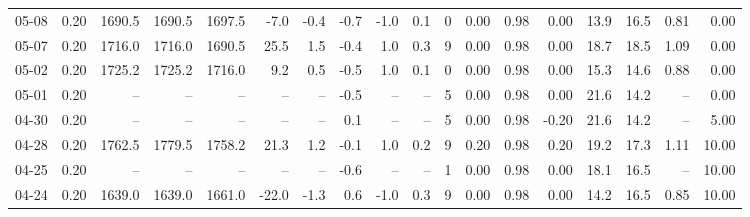 \begin{threeparttable}
{\begin{tabular}{lrrrrrrrrrrrrrrrrr}
  05-08 &     0.20 & 1690.5 & 1690.5 & 1697.5 &       -7.0 &           -0.4 &                      -0.7 &                     -1.0 &                 0.1 &              0 &       0.00 &      0.98 &           0.00 &             13.9 &                16.5 &            0.81 &                   0.00 \\
  05-07 &     0.20 & 1716.0 & 1716.0 & 1690.5 &       25.5 &            1.5 &                      -0.4 &                      1.0 &                 0.3 &              9 &       0.00 &      0.98 &           0.00 &             18.7 &                18.5 &            1.09 &                   0.00 \\
  05-02 &     0.20 & 1725.2 & 1725.2 & 1716.0 &        9.2 &            0.5 &                      -0.5 &                      1.0 &                 0.1 &              0 &       0.00 &      0.98 &           0.00 &             15.3 &                14.6 &            0.88 &                   0.00 \\
  05-01 &     0.20 &     -- &     -- &     -- &         -- &             -- &                      -0.5 &                       -- &                  -- &              5 &       0.00 &      0.98 &           0.00 &             21.6 &                14.2 &              -- &                   0.00 \\
  04-30 &     0.20 &     -- &     -- &     -- &         -- &             -- &                       0.1 &                       -- &                  -- &              5 &       0.00 &      0.98 &          -0.20 &             21.6 &                14.2 &              -- &                   5.00 \\
  04-28 &     0.20 & 1762.5 & 1779.5 & 1758.2 &       21.3 &            1.2 &                      -0.1 &                      1.0 &                 0.2 &              9 &       0.20 &      0.98 &           0.20 &             19.2 &                17.3 &            1.11 &                  10.00 \\
  04-25 &     0.20 &     -- &     -- &     -- &         -- &             -- &                      -0.6 &                       -- &                  -- &              1 &       0.00 &      0.98 &           0.00 &             18.1 &                16.5 &              -- &                  10.00 \\
  04-24 &     0.20 & 1639.0 & 1639.0 & 1661.0 &      -22.0 &           -1.3 &                       0.6 &                     -1.0 &                 0.3 &              9 &       0.00 &      0.98 &           0.00 &             14.2 &                16.5 &            0.85 &                  10.00 \\

\end{tabular}}
\end{threeparttable}
